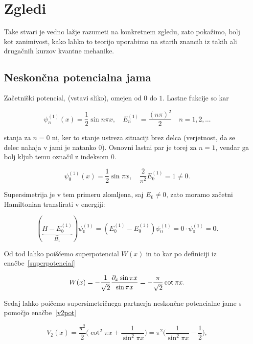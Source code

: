 \section{Zgledi}

Take stvari je vedno la\v zje razumeti na konkretnem zgledu, zato poka\v zimo, bolj kot zanimivost,
kako lahko to teorijo uporabimo na starih znancih iz takih ali druga\v cnih kurzov kvantne mehanike.

\subsection{Neskon\v cna potencialna jama}

Za\v cetni\v ski potencial, (vstavi sliko), omejen od $0$ do $1$. Lastne fukcije so kar

\begin{equation}
	\psi_n^{(1)} (x) = \frac{1}{2}\sin n\pi x, \quad E_n^{(1)} = \frac{(n\pi)^2}{2}
		\quad n = 1,2,\ldots
\end{equation}

stanja za $n = 0$ ni, ker to stanje ustreza situaciji brez delca (verjetnost, da se delec nahaja v jami
je natanko 0). Osnovni lastni par je torej za $n = 1$, vendar ga bolj kljub temu ozna\v cil z indeksom 0.

\begin{equation}
	\psi_0^{(1)} (x) = \frac{1}{2}\sin\pi x, \quad \frac{2}{\pi^2}E_0^{(1)} = 1 \neq 0.
\end{equation}

Supersimetrija je v tem primeru zlomljena, saj $E_0 \neq 0$, zato moramo za\v cetni Hamiltonian
translirati v energiji:

\begin{equation}
	(\underbrace{H - E_0^{(1)}}_{H_1})\psi_0^{(1)} = (E_0^{(1)} - E_0^{(1)})\psi_0^{(1)} =
		0\cdot\psi_0^{(1)} = 0. \label{translacija}
\end{equation}

Od tod lahko poi\v s\v cemo superpotencial $W(x)$ in to kar po definiciji iz
ena\v cbe~\eqref{superpotencial}

\begin{equation}
	W(x) = -\frac{1}{\sqrt{2}} \frac{\partial_x \sin \pi x}{\sin \pi x} = -\frac{\pi}{\sqrt{2}}\cot \pi x.
\end{equation}

Sedaj lahko poi\v cemo supersimetri\v cnega partnerja neskon\v cne potencialne jame s pomo\v cjo
ena\v cbe~\eqref{v2pot}

\begin{equation}
	V_2 (x) = \frac{\pi^2}{2}\bigg(\cot^2 \pi x + \frac{1}{\sin^2 \pi x}\bigg)
		= \pi^2\bigg(\frac{1}{\sin^2 \pi x} - \frac{1}{2}\bigg),
	\label{pot-nes-jama}
\end{equation}

